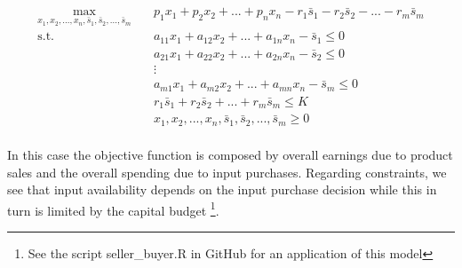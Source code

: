 \documentclass[12pt]{article}         %
\begin{document}
\begin{equation}
\begin{aligned}
\max_{x_1,x_2,...,x_n,\bar{s}_1,\bar{s}_2,...,\bar{s}_m} \quad & p_1x_1 + p_2x_2 + ... + p_nx_n - r_1\bar{s}_1 - r_2\bar{s}_2 - ... - r_m\bar{s}_m \\
\textrm{s.t.} \quad & a_{11}x_1 + a_{12}x_2 + ... + a_{1n}x_n - \bar{s}_1 \leq 0\\
  &a_{21}x_1 + a_{22}x_2 + ... + a_{2n}x_n - \bar{s}_2 \leq 0\\
  &\vdots \\
  &a_{m1}x_1 + a_{m2}x_2 + ... + a_{mn}x_n - \bar{s}_m \leq 0\\
  &r_1\bar{s}_1 + r_2\bar{s}_2 + ... + r_m\bar{s}_m \leq K \\
  &x_1,x_2,...,x_n,\bar{s}_1,\bar{s}_2,...,\bar{s}_m\geq0    \\
\end{aligned}
\end{equation}

In this case the objective function is composed by overall earnings due to product sales and the overall spending due to input purchases. Regarding constraints, we see that input availability depends on the input purchase decision while this in turn is limited by the capital budget \footnote{See the script seller\_buyer.R in GitHub for an application of this model}.
\end{document}
